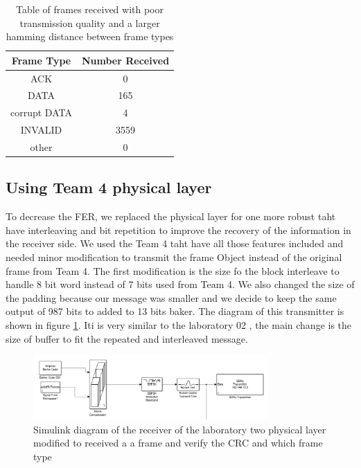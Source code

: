 \begin{table}[ht]
	\centering
		\begin{tabular}{| c | c | }
		\hline                       
		Frame Type & Number Received\\
		\hline
			ACK & 0\\
			DATA & 165\\
			corrupt DATA & 4\\
			INVALID & 3559\\
			other & 0\\
		\hline
		\end{tabular}
	\caption{Table of frames received with poor transmission quality and a larger hamming distance between frame types}
	\label{tab:0ACK}
\end{table}
\subsection{Using Team 4 physical layer}
\label{team4_results}
To decrease the FER, we replaced the physical layer for one more robust taht have interleaving and bit repetition to improve the recovery of the information in the receiver side.
We used the Team 4 taht have all those features included and needed minor modification to transmit the frame Object instead of the original frame from Team 4.
The first modification is the size fo the block interleave to handle 8 bit word instead of 7 bits used from Team 4. We also changed the size of the padding because our message was smaller and we decide to keep the same output of 987 bits to added to 13 bits baker. The diagram of this transmitter is shown in figure \ref{fig:transmitter_team4}. Iti is very similar to the laboratory 02 , the main change is the size of buffer to fit the repeated and interleaved message.  
\begin{figure}[ht]
    \centering
    \includegraphics[width=0.8\textwidth]{transmitter_team4.PNG}
    \caption{Simulink diagram of the receiver of the laboratory two physical layer modified to received a a frame and verify the CRC and which frame type }
    \label{fig:transmitter_team4}
\end{figure}


